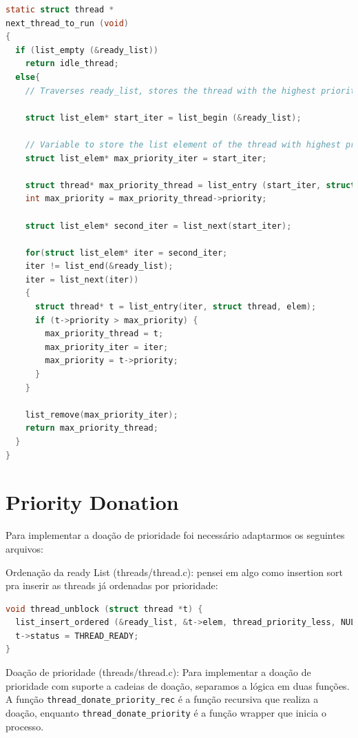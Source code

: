 \documentclass{article}
\begin{document}
\begin{lstlisting}[language=C]
static struct thread *
next_thread_to_run (void) 
{
  if (list_empty (&ready_list))
    return idle_thread;
  else{
    // Traverses ready_list, stores the thread with the highest priority, removes it from the list and return it.
    
    struct list_elem* start_iter = list_begin (&ready_list);

    // Variable to store the list element of the thread with highest priority to remove it at the end of the function
    struct list_elem* max_priority_iter = start_iter;

    struct thread* max_priority_thread = list_entry (start_iter, struct thread, elem);
    int max_priority = max_priority_thread->priority;

    struct list_elem* second_iter = list_next(start_iter);

    for(struct list_elem* iter = second_iter;
    iter != list_end(&ready_list);
    iter = list_next(iter))
    {
      struct thread* t = list_entry(iter, struct thread, elem);
      if (t->priority > max_priority) {
        max_priority_thread = t;
        max_priority_iter = iter;
        max_priority = t->priority;
      }
    }

    list_remove(max_priority_iter);
    return max_priority_thread;
  }
}
\end{lstlisting}

\section*{Priority Donation}
Para implementar a doação de prioridade foi necessário adaptarmos os seguintes arquivos:


Ordenação da ready List (threads/thread.c): pensei em algo como insertion sort pra inserir as threads já ordenadas por prioridade: 
\newpage


\begin{lstlisting}[language=C]
void thread_unblock (struct thread *t) {
  list_insert_ordered (&ready_list, &t->elem, thread_priority_less, NULL);
  t->status = THREAD_READY;
}
\end{lstlisting}

\hfill \break

Doação de prioridade (threads/thread.c): Para implementar a doação de prioridade com suporte a cadeias de doação, separamos a lógica em duas funções. A função \texttt{thread\_donate\_priority\_rec} é a função recursiva que realiza a doação, enquanto \texttt{thread\_donate\_priority} é a função wrapper que inicia o processo.
\end{document}
